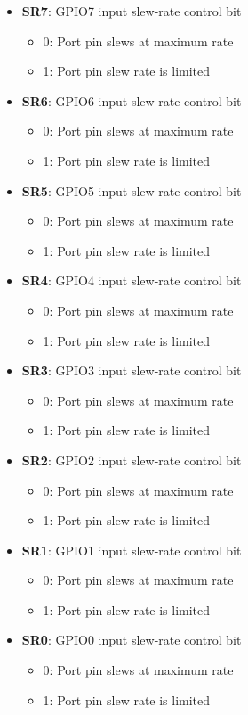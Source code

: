 \documentclass{article}
\begin{document}
	\begin{itemize}
		\item \textbf{SR7}: GPIO7 input slew-rate control bit
		\begin{itemize}
			\item 0: Port pin slews at maximum rate
			\item 1: Port pin slew rate is limited
		\end{itemize}
		\item \textbf{SR6}: GPIO6 input slew-rate control bit
		\begin{itemize}
			\item 0: Port pin slews at maximum rate
			\item 1: Port pin slew rate is limited
		\end{itemize}
		\item \textbf{SR5}: GPIO5 input slew-rate control bit
		\begin{itemize}
			\item 0: Port pin slews at maximum rate
			\item 1: Port pin slew rate is limited
		\end{itemize}
		\item \textbf{SR4}: GPIO4 input slew-rate control bit
		\begin{itemize}
			\item 0: Port pin slews at maximum rate
			\item 1: Port pin slew rate is limited
		\end{itemize}
		\item \textbf{SR3}: GPIO3 input slew-rate control bit
		\begin{itemize}
			\item 0: Port pin slews at maximum rate
			\item 1: Port pin slew rate is limited
		\end{itemize}
		\item \textbf{SR2}: GPIO2 input slew-rate control bit
		\begin{itemize}
			\item 0: Port pin slews at maximum rate
			\item 1: Port pin slew rate is limited
		\end{itemize}
		\item \textbf{SR1}: GPIO1 input slew-rate control bit
		\begin{itemize}
			\item 0: Port pin slews at maximum rate
			\item 1: Port pin slew rate is limited
		\end{itemize}
		\item \textbf{SR0}: GPIO0 input slew-rate control bit
		\begin{itemize}
			\item 0: Port pin slews at maximum rate
			\item 1: Port pin slew rate is limited
		\end{itemize}
		
	\end{itemize}
	
	
\end{document}

